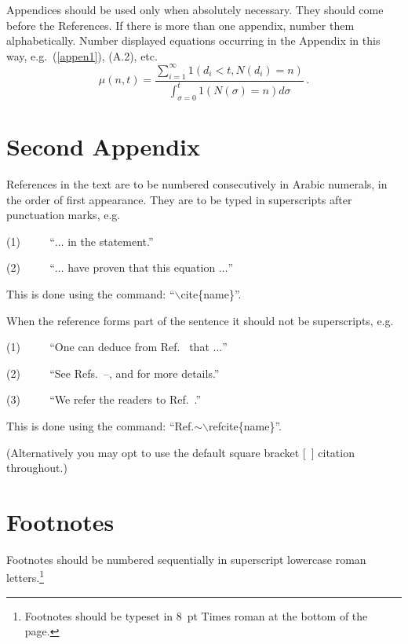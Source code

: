 \documentclass{ws-procs9x6}
\begin{document}
\renewcommand{\theequation}{A.\arabic{equation}}

Appendices should be used only when absolutely necessary. They
should come before the References. If there is more than one
appendix, number them alphabetically. Number displayed equations
occurring in the Appendix in this way, e.g.~(\ref{appen1}), (A.2),
etc.
\begin{equation}
\mu(n, t) = \frac{\sum^\infty_{i=1} 1(d_i < t, 
N(d_i) = n)}{\int^t_{\sigma=0} 1(N(\sigma) = n)d\sigma}\,. \label{appen1}
\end{equation}

\section{Second Appendix}

\renewcommand{\theequation}{B.\arabic{equation}}

References in the text are to be numbered consecutively in Arabic
numerals, in the order of first appearance. They are to be typed in
superscripts after punctuation marks, e.g.

(1) $ \qquad $ ``$\ldots$ in the statement.\cite{xyan}''

(2) $ \qquad $ ``$\ldots$ have proven\cite{bu}\cdash\cite{xyan} 
that this equation $\ldots$''

\noindent
This is done using the command: ``$\backslash$cite\{name\}''.

When the reference forms part of the sentence it should not 
be superscripts, e.g.

(1) $ \qquad $  ``One can deduce from Ref.~ that $\ldots$''

(2) $ \qquad $  ``See Refs.~--,  
and  for more details.'' 

(3) $ \qquad $  ``We refer the readers to Ref.~.''

\noindent
This is done using the command: ``Ref.$\sim$$\backslash$refcite\{name\}''.

\vspace*{8pt}
\noindent
(Alternatively you may opt to use the default square bracket [\ ] 
citation throughout.)

\section{Footnotes}
Footnotes should be numbered sequentially in superscript lowercase
roman letters.\footnote{Footnotes should be typeset in 8~pt Times
roman at the bottom of the page.}
\end{document}
